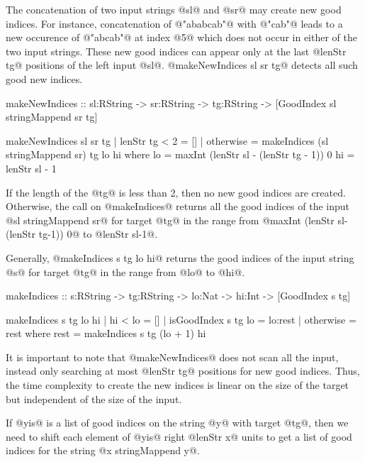 The concatenation of two input strings @sl@ and @sr@
may create new good indices.
%
For instance, concatenation of
@"ababcab"@ with @"cab"@
leads to a new occurence of @"abcab"@ at index @5@ which
does not occur in either of the two input strings.
%
These new good indices can appear only at the last @lenStr tg@ positions
of the left input @sl@.
%
@makeNewIndices sl sr tg@ detects all such good new indices.
%
\begin{code}
  makeNewIndices
    :: sl:RString -> sr:RString -> tg:RString
    -> [GoodIndex {sl stringMappend sr} tg]
    
  makeNewIndices sl sr tg
    | lenStr tg < 2 = []
    | otherwise     = makeIndices (sl stringMappend sr) tg lo hi
    where
      lo = maxInt (lenStr sl - (lenStr tg - 1)) 0
      hi = lenStr sl - 1
\end{code}
If the length of the @tg@ is less than 2, then no new good indices are created.
%
Otherwise,
the call on @makeIndices@ returns all the good indices of the input
@sl stringMappend sr@ for target @tg@
in the range from @maxInt (lenStr sl-(lenStr tg-1)) 0@ to  @lenStr sl-1@.
%

Generally, @makeIndices s tg lo hi@ returns the good indices
of the input string @s@ for target @tg@ in the range from @lo@ to @hi@.
%
\begin{code}
  makeIndices :: s:RString -> tg:RString -> lo:Nat
              -> hi:Int -> [GoodIndex s tg]
    
  makeIndices s tg lo hi  
    | hi < lo             = []
    | isGoodIndex s tg lo = lo:rest
    | otherwise           = rest
    where
      rest = makeIndices s tg (lo + 1) hi
\end{code}

It is important to note that
@makeNewIndices@ does not scan all the input,
instead only searching at most @lenStr tg@ positions for new good indices.
%
Thus, the time complexity to create the new indices is linear
on the size of the target but independent of the size of the input.

If @yis@ is a list of good indices on the string @y@ with target @tg@,
then we need to shift each element of @yis@ right @lenStr x@ units to
get a list of good indices for the string @x stringMappend y@.

